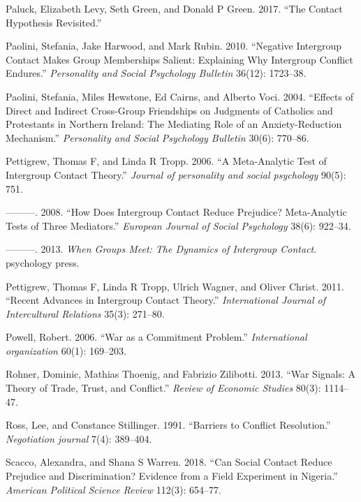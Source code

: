 \documentclass[11pt]{article}
\begin{document}
\leavevmode\hypertarget{ref-paluck2017contact}{}%
Paluck, Elizabeth Levy, Seth Green, and Donald P Green. 2017. ``The
Contact Hypothesis Revisited.''

\leavevmode\hypertarget{ref-paolini2010negative}{}%
Paolini, Stefania, Jake Harwood, and Mark Rubin. 2010. ``Negative
Intergroup Contact Makes Group Memberships Salient: Explaining Why
Intergroup Conflict Endures.'' \emph{Personality and Social Psychology
Bulletin} 36(12): 1723--38.

\leavevmode\hypertarget{ref-paolini2004effects}{}%
Paolini, Stefania, Miles Hewstone, Ed Cairns, and Alberto Voci. 2004.
``Effects of Direct and Indirect Cross-Group Friendships on Judgments of
Catholics and Protestants in Northern Ireland: The Mediating Role of an
Anxiety-Reduction Mechanism.'' \emph{Personality and Social Psychology
Bulletin} 30(6): 770--86.

\leavevmode\hypertarget{ref-pettigrew2006meta}{}%
Pettigrew, Thomas F, and Linda R Tropp. 2006. ``A Meta-Analytic Test of
Intergroup Contact Theory.'' \emph{Journal of personality and social
psychology} 90(5): 751.

\leavevmode\hypertarget{ref-pettigrew2008does}{}%
---------. 2008. ``How Does Intergroup Contact Reduce Prejudice?
Meta-Analytic Tests of Three Mediators.'' \emph{European Journal of
Social Psychology} 38(6): 922--34.

\leavevmode\hypertarget{ref-pettigrew2013groups}{}%
---------. 2013. \emph{When Groups Meet: The Dynamics of Intergroup
Contact}. psychology press.

\leavevmode\hypertarget{ref-pettigrew2011advances}{}%
Pettigrew, Thomas F, Linda R Tropp, Ulrich Wagner, and Oliver Christ.
2011. ``Recent Advances in Intergroup Contact Theory.''
\emph{International Journal of Intercultural Relations} 35(3): 271--80.

\leavevmode\hypertarget{ref-powell2006war}{}%
Powell, Robert. 2006. ``War as a Commitment Problem.''
\emph{International organization} 60(1): 169--203.

\leavevmode\hypertarget{ref-rohner2013war}{}%
Rohner, Dominic, Mathias Thoenig, and Fabrizio Zilibotti. 2013. ``War
Signals: A Theory of Trade, Trust, and Conflict.'' \emph{Review of
Economic Studies} 80(3): 1114--47.

\leavevmode\hypertarget{ref-ross1991barriers}{}%
Ross, Lee, and Constance Stillinger. 1991. ``Barriers to Conflict
Resolution.'' \emph{Negotiation journal} 7(4): 389--404.

\leavevmode\hypertarget{ref-scacco2018nigeria}{}%
Scacco, Alexandra, and Shana S Warren. 2018. ``Can Social Contact Reduce
Prejudice and Discrimination? Evidence from a Field Experiment in
Nigeria.'' \emph{American Political Science Review} 112(3): 654--77.
\end{document}
